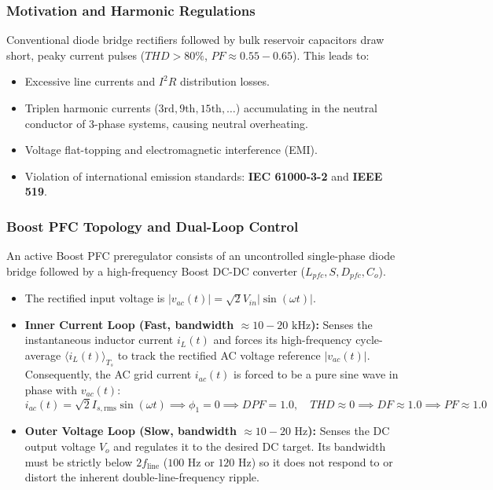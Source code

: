 \subsubsection{Motivation and Harmonic Regulations}
Conventional diode bridge rectifiers followed by bulk reservoir capacitors draw short, peaky current pulses ($THD > 80\%$, $PF \approx 0.55 - 0.65$). This leads to:
\begin{itemize}
  \item Excessive line currents and $I^2 R$ distribution losses.
  \item Triplen harmonic currents ($3\mathrm{rd}, 9\mathrm{th}, 15\mathrm{th}, \dots$) accumulating in the neutral conductor of 3-phase systems, causing neutral overheating.
  \item Voltage flat-topping and electromagnetic interference (EMI).
  \item Violation of international emission standards: \textbf{IEC 61000-3-2} and \textbf{IEEE 519}.
\end{itemize}

\subsubsection{Boost PFC Topology and Dual-Loop Control}
An active Boost PFC preregulator consists of an uncontrolled single-phase diode bridge followed by a high-frequency Boost DC-DC converter ($L_{pfc}, S, D_{pfc}, C_o$).
\begin{itemize}
  \item The rectified input voltage is $|v_{ac}(t)| = \sqrt{2} V_{in}|\sin(\omega t)|$.
  \item \textbf{Inner Current Loop (Fast, bandwidth $\approx 10 - 20\text{ kHz}$):} Senses the instantaneous inductor current $i_L(t)$ and forces its high-frequency cycle-average $\langle i_L(t) \rangle_{T_s}$ to track the rectified AC voltage reference $|v_{ac}(t)|$. Consequently, the AC grid current $i_{ac}(t)$ is forced to be a pure sine wave in phase with $v_{ac}(t)$:
  \begin{equation}
  i_{ac}(t) = \sqrt{2} I_{s,\mathrm{rms}}\sin(\omega t) \implies \phi_1 = 0 \implies DPF = 1.0, \quad THD \approx 0 \implies DF \approx 1.0 \implies PF \approx 1.0
  \end{equation}
  \item \textbf{Outer Voltage Loop (Slow, bandwidth $\approx 10 - 20\text{ Hz}$):} Senses the DC output voltage $V_o$ and regulates it to the desired DC target. Its bandwidth must be strictly below $2 f_{\mathrm{line}}$ ($100\text{ Hz}$ or $120\text{ Hz}$) so it does not respond to or distort the inherent double-line-frequency ripple.
\end{itemize}

